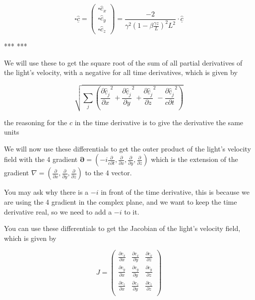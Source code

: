 \begin{equation}
	  \square \underline{\hat{c}} =
	  \begin{pmatrix}
		\square \hat{c}_x \\
		\square \hat{c}_y \\
		\square \hat{c}_z
	  \end{pmatrix}
	  =
	  \frac{-2}{\gamma^2\left( 1 - \beta \frac{\gamma z}{L} \right)^2L^2} \cdot \underline{\hat{c}}
\end{equation}

***
***


We will use these to get the square root of the sum of all partial derivatives of the light's velocity, with a negative for all time derivatives, which is given by

\begin{equation}
	\sqrt{\sum_{j} \left( \frac{\partial \underline{\hat{c}}_j}{\partial x}^2 + \frac{\partial \underline{\hat{c}}_j}{\partial y}^2 + \frac{\partial \underline{\hat{c}}_j}{\partial z}^2 - \frac{\partial \underline{\hat{c}}_j}{c\partial t}^2 \right) }
\end{equation}

the reasoning for the $c$ in the time derivative is to give the derivative the same units



We will now use these differentials to get the outer product of the light's velocity field with the 4 gradient $\boldsymbol{\partial} = \left( -i\frac{\partial}{c \partial t}, \frac{\partial}{\partial x}, \frac{\partial}{\partial y}, \frac{\partial}{\partial z} \right)$ which is the extension of the gradient $\nabla=\left( \frac{\partial}{\partial x}, \frac{\partial}{\partial y}, \frac{\partial}{\partial z} \right)$ to the 4 vector.



You may ask why there is a $-i$ in front of the time derivative, this is because we are using the 4 gradient in the complex plane, and we want to keep the time derivative real, so we need to add a $-i$ to it.

You can use these differentials to get the Jacobian of the light's velocity field, which is given by

\begin{equation}
	J =
	\begin{pmatrix}
		\frac{\partial c_x}{\partial x} & \frac{\partial c_x}{\partial y} & \frac{\partial c_x}{\partial z} \\
		\frac{\partial c_y}{\partial x} & \frac{\partial c_y}{\partial y} & \frac{\partial c_y}{\partial z} \\
		\frac{\partial c_z}{\partial x} & \frac{\partial c_z}{\partial y} & \frac{\partial c_z}{\partial z} \\
	\end{pmatrix}
\end{equation}

